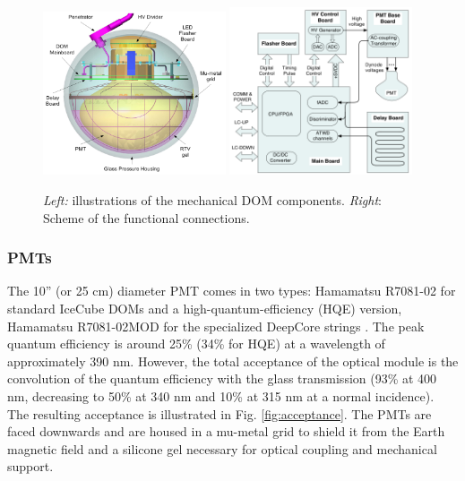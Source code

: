 \begin{figure}
\includegraphics[width=0.48\textwidth]{chapter5/img/DOM-Picture.png}
\includegraphics[width=0.48\textwidth]{chapter5/img/electronicsDOM.png}
\caption{\textit{Left:} illustrations of the mechanical DOM components. \textit{Right}: Scheme of the functional connections.}
\label{fig:DOM}
\end{figure}

\subsubsection{PMTs}
The 10'' (or 25 cm) diameter PMT comes in two types: Hamamatsu R7081-02 for standard IceCube DOMs and a high-quantum-efficiency (HQE) version, Hamamatsu R7081-02MOD for the specialized DeepCore strings \cite{Abbasi:2010vc}. The peak quantum efficiency is around 25\% (34\% for HQE) at a wavelength of approximately 390 nm. However, the total acceptance of the optical module is the convolution of the quantum efficiency with the glass transmission (93\% at 400 nm, decreasing to 50\% at 340 nm and 10\% at 315 nm at a normal incidence). The resulting acceptance is illustrated in Fig. \ref{fig:acceptance}. The PMTs are faced downwards and are housed in a mu-metal grid to shield it from the Earth magnetic field and a silicone gel necessary for optical coupling and mechanical support.

